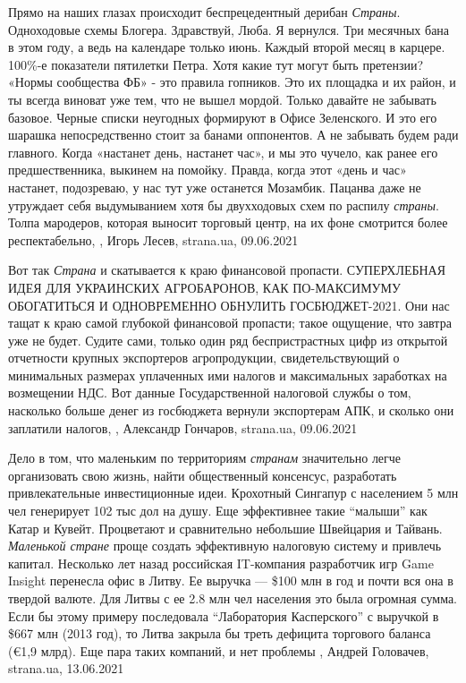Прямо на наших глазах происходит беспрецедентный дерибан \emph{Страны}.  Одноходовые
схемы Блогера. Здравствуй, Люба. Я вернулся. Три месячных бана в этом году, а
ведь на календаре только июнь. Каждый второй месяц в карцере. 100\%-е
показатели пятилетки Петра.  Хотя какие тут могут быть претензии? «Нормы
сообщества ФБ» - это правила гопников. Это их площадка и их район, и ты всегда
виноват уже тем, что не вышел мордой.  Только давайте не забывать базовое.
Черные списки неугодных формируют в Офисе Зеленского. И это его шарашка
непосредственно стоит за банами оппонентов. А не забывать будем ради главного.
Когда «настанет день, настанет час», и мы это чучело, как ранее его
предшественника, выкинем на помойку.  Правда, когда этот «день и час»
настанет, подозреваю, у нас тут уже останется Мозамбик.  Пацанва даже не
утруждает себя выдумыванием хотя бы двухходовых схем по распилу \emph{страны}. Толпа
мародеров, которая выносит торговый центр, на их фоне смотрится более
респектабельно,
, Игорь Лесев, strana.ua, 09.06.2021

Вот так \emph{Страна} и скатывается к краю финансовой пропасти. СУПЕРХЛЕБНАЯ
ИДЕЯ ДЛЯ УКРАИНСКИХ АГРОБАРОНОВ, КАК ПО-МАКСИМУМУ ОБОГАТИТЬСЯ И ОДНОВРЕМЕННО
ОБНУЛИТЬ ГОСБЮДЖЕТ-2021. Они нас тащат к краю самой глубокой финансовой
пропасти; такое ощущение, что завтра уже не будет. Судите сами, только один ряд
беспристрастных цифр из открытой отчетности крупных экспортеров агропродукции,
свидетельствующий о минимальных размерах уплаченных ими налогов и максимальных
заработках на возмещении НДС. Вот данные Государственной налоговой службы о
том, насколько больше денег из госбюджета вернули экспортерам АПК, и сколько
они заплатили налогов,
, Александр Гончаров, strana.ua, 09.06.2021


Дело в том, что маленьким по территориям \emph{странам} значительно легче организовать
свою жизнь, найти общественный консенсус, разработать привлекательные
инвестиционные идеи. Крохотный Сингапур с населением 5 млн чел генерирует 102
тыс дол на душу. Еще эффективнее такие \enquote{малыши} как Катар и Кувейт.
Процветают и сравнительно небольшие Швейцария и Тайвань.  \emph{Маленькой стране}
проще создать эффективную налоговую систему и привлечь капитал.  Несколько лет
назад российская IT-компания разработчик игр Game Insight перенесла офис в
Литву. Ее выручка — \$100 млн в год и почти вся она в твердой валюте. Для Литвы
с ее 2.8 млн чел населения это была огромная сумма. Если бы этому примеру
последовала \enquote{Лаборатория Касперского} с выручкой в \$667 млн (2013
год), то Литва закрыла бы треть дефицита торгового баланса (€1,9 млрд). Еще
пара таких компаний, и нет проблемы
, 
Андрей Головачев, strana.ua, 13.06.2021

